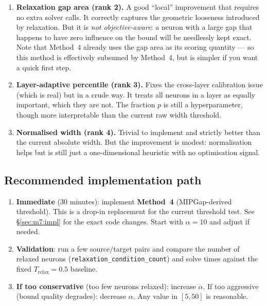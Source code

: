\documentclass[11pt,a4paper]{article}
\newcommand{\Trelax}{T_{\mathrm{relax}}}
\begin{document}
\begin{verdict}
\begin{enumerate}[leftmargin=2em, label=\textbf{\arabic*.}]
\item \textbf{Relaxation gap area (rank 2).}
A good ``local'' improvement that requires no extra solver calls.  It correctly
captures the geometric looseness introduced by relaxation.  But it is
\emph{not objective-aware}: a neuron with a large gap that happens to have
zero influence on the bound will be needlessly kept exact.
Note that Method~4 already uses the gap area as its scoring quantity --- so
this method is effectively subsumed by Method~4, but is simpler if you want
a quick first step.

\item \textbf{Layer-adaptive percentile (rank 3).}
Fixes the cross-layer calibration issue (which is real) but in a crude way.
It treats all neurons in a layer as equally important, which they are not.
The fraction $p$ is still a hyperparameter, though more interpretable than
the current raw width threshold.

\item \textbf{Normalised width (rank 4).}
Trivial to implement and strictly better than the current absolute width.
But the improvement is modest: normalisation helps but is still just a
one-dimensional heuristic with no optimisation signal.

\end{enumerate}
\end{verdict}

\subsection{Recommended implementation path}

\begin{enumerate}
  \item \textbf{Immediate} (30 minutes): implement \textbf{Method~4}
        (MIPGap-derived threshold).  This is a drop-in replacement for the
        current threshold test.  See \S\ref{sec:m7:impl} for the exact code
        changes.  Start with $\alpha = 10$ and adjust if needed.

  \item \textbf{Validation}: run a few source/target pairs and compare the
        number of relaxed neurons (\texttt{relaxation\_condition\_count}) and
        solve times against the fixed $\Trelax = 0.5$ baseline.

  \item \textbf{If too conservative} (too few neurons relaxed): increase
        $\alpha$.  If too aggressive (bound quality degrades): decrease
        $\alpha$.  Any value in $[5, 50]$ is reasonable.
\end{enumerate}
\end{document}
